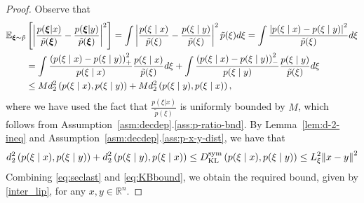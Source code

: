 \documentclass[11pt,reqno]{amsart}
\newcommand{\1}{{\bf 1}}
\newcommand{\2}{{\bf 2}}
\newcommand{\pc}[1]{{\color{cyan}#1}}
\newcommand{\us}[1]{\textcolor{red}{#1}}
\newcommand{\bxi}{\boldsymbol{\xi}}
\newcommand{\E}{\mathbb E}
\newcommand{\R}{\mathbb R}
\newcommand{\lln}{\left|}
\newcommand{\rrn}{\right|}
\numberwithin{equation}{section}
\theoremstyle{remark}
\begin{document}
{{				\begin{proof}
				Observe that
				\begin{align}\label{eq:seclast}
					\notag     \E_{\bxi \sim \tilde{p}} &\left[{\lln \dfrac{p(\bxi | x)}{\tilde{p}(\bxi)} - \dfrac{p(\bxi | y)}{\tilde{p}(\bxi)} \rrn}^2 \right] 
					= 
					\int \left|\frac{p(\xi \mid x)}{\tilde{p}(\xi)}-\frac{p(\xi \mid y)}{\tilde{p}(\xi)}\right|^2 \tilde{p}(\xi)d\xi=\int \frac{\left|p(\xi \mid x)-p(\xi \mid y)\right|^2}{\tilde{p}(\xi)} d\xi\nonumber\\
					&=\int \frac{\left(p(\xi \mid x)-p(\xi \mid y)\right)_+^2}{p(\xi \mid x)}\frac{p(\xi \mid x)}{\tilde{p}(\xi)} d\xi+\int \frac{\left(p(\xi \mid x)-p(\xi \mid y)\right)_-^2}{p(\xi \mid y)}\frac{p(\xi \mid y)}{\tilde{p}(\xi)} d\xi\nonumber\\
					& \leq Md^2_2\left(p(\xi \mid x),p(\xi \mid y)\right)+Md^2_2\left(p(\xi \mid y),p(\xi \mid x)\right),
				\end{align}
				where we have used the fact that $\frac{p(\xi | x)}{\tilde p (\xi)}$ is uniformly bounded by $M$, which follows from Assumption~\ref{asm:decdep}.\ref{ass:p-ratio-bnd}. 
				By Lemma~\ref{lem:d-2-ineq} and Assumption~\ref{asm:decdep}.\ref{ass:p-x-y-dist}, we have that
				\begin{equation}\label{eq:KBbound}
					d^2_2\left(p(\xi \mid x),p(\xi \mid y)\right)+d^2_2\left(p(\xi \mid y),p(\xi \mid x)\right) \leq D_{{\textnormal{KL}}}^{{\rm sym}}\left(p(\xi \mid x),p(\xi \mid y)\right) \leq L_\xi^2{\|x-y\|}^2
				\end{equation}
				Combining \eqref{eq:seclast} and \eqref{eq:KBbound}, we obtain the required bound, given by \eqref{inter_lip}, for any $x, y \in \R^n$.
				\end{proof}
				
				\medskip
				
}}
\end{document}
